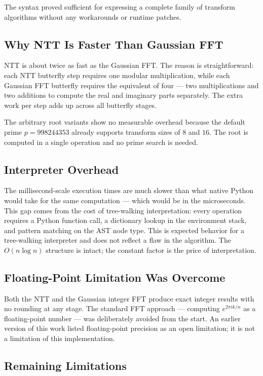 \documentclass[conference]{IEEEtran}
\begin{document}
The syntax proved sufficient for expressing a complete family of transform algorithms without any workarounds or runtime patches.

\subsection{Why NTT Is Faster Than Gaussian FFT}

NTT is about twice as fast as the Gaussian FFT. The reason is straightforward: each NTT butterfly step requires one modular multiplication, while each Gaussian FFT butterfly requires the equivalent of four — two multiplications and two additions to compute the real and imaginary parts separately. The extra work per step adds up across all butterfly stages.

The arbitrary root variants show no measurable overhead because the default prime $p = 998244353$ already supports transform sizes of $8$ and $16$. The root is computed in a single operation and no prime search is needed.

\subsection{Interpreter Overhead}

The millisecond-scale execution times are much slower than what native Python would take for the same computation — which would be in the microseconds. This gap comes from the cost of tree-walking interpretation: every operation requires a Python function call, a dictionary lookup in the environment stack, and pattern matching on the AST node type. This is expected behavior for a tree-walking interpreter and does not reflect a flaw in the algorithm. The $O(n \log n)$ structure is intact; the constant factor is the price of interpretation.

\subsection{Floating-Point Limitation Was Overcome}

Both the NTT and the Gaussian integer FFT produce exact integer results with no rounding at any stage. The standard FFT approach — computing $e^{2\pi i k/n}$ as a floating-point number — was deliberately avoided from the start. An earlier version of this work listed floating-point precision as an open limitation; it is not a limitation of this implementation.

\subsection{Remaining Limitations}
\end{document}
